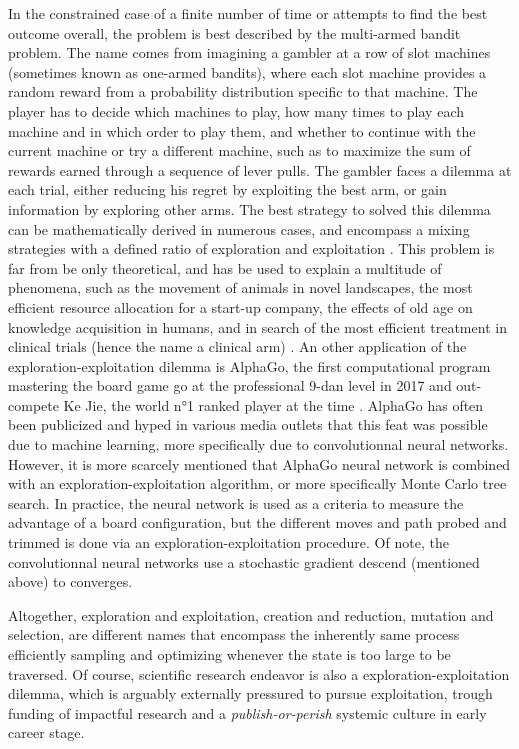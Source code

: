 In the constrained case of a finite number of time or attempts to find the best outcome overall, the problem is best described by the multi-armed bandit problem. The name comes from imagining a gambler at a row of slot machines (sometimes known as one-armed bandits), where each slot machine provides a random reward from a probability distribution specific to that machine. The player has to decide which machines to play, how many times to play each machine and in which order to play them, and whether to continue with the current machine or try a different machine, such as to maximize the sum of rewards earned through a sequence of lever pulls.
The gambler faces a dilemma at each trial, either reducing his regret by exploiting the best arm, or gain information by exploring other arms.
The best strategy to solved this dilemma can be mathematically derived in numerous cases, and encompass a mixing strategies with a defined ratio of exploration and exploitation \citep{Auer2002,Kocsis2006,Furnkranz2006}.
This problem is far from be only theoretical, and has be used to explain a multitude of phenomena, such as the movement of animals in novel landscapes, the most efficient resource allocation for a start-up company, the effects of old age on knowledge acquisition in humans, and in search of the most efficient treatment in clinical trials (hence the name a clinical arm) \citep{Berger-Tal2014, March}. 
An other application of the exploration-exploitation dilemma is AlphaGo, the first computational program mastering the board game go at the professional 9-dan level in 2017 and out-compete Ke Jie, the world n°1 ranked player at the time \citep{Silver2017, Silver2018}.
AlphaGo has often been publicized and hyped in various media outlets that this feat was possible due to machine learning, more specifically due to convolutionnal neural networks.
However, it is more scarcely mentioned that AlphaGo neural network is combined with an exploration-exploitation algorithm, or more specifically Monte Carlo tree search. 
In practice, the neural network is used as a criteria to measure the advantage of a board configuration, but the different moves and path probed and trimmed is done via an exploration-exploitation procedure. 
Of note, the convolutionnal neural networks use a stochastic gradient descend (mentioned above) to converges.

Altogether, exploration and exploitation, creation and reduction, mutation and selection, are different names that encompass the inherently same process efficiently sampling and optimizing whenever the state is too large to be traversed.
Of course, scientific research endeavor is also a exploration-exploitation dilemma, which is arguably externally pressured to pursue exploitation, trough funding of impactful research and a \textit{publish-or-perish} systemic culture in early career stage.

